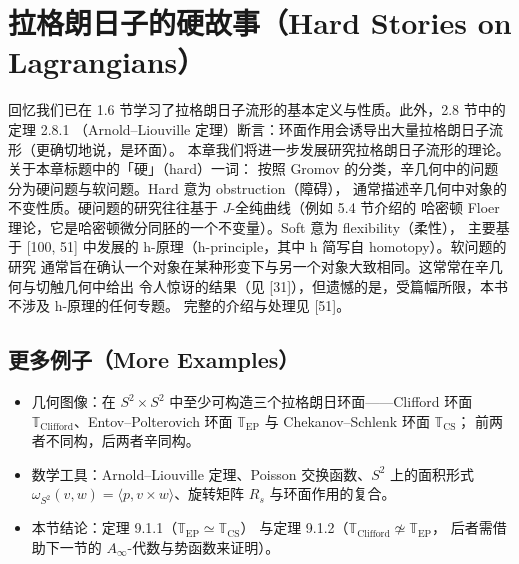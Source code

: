 
\chapter{拉格朗日子的硬故事（Hard Stories on Lagrangians）}

回忆我们已在 1.6 节学习了拉格朗日子流形的基本定义与性质。此外，2.8 节中的定理 2.8.1
（Arnold--Liouville 定理）断言：环面作用会诱导出大量拉格朗日子流形（更确切地说，是环面）。
本章我们将进一步发展研究拉格朗日子流形的理论。关于本章标题中的「硬」（hard）一词：
按照 Gromov 的分类，辛几何中的问题分为硬问题与软问题。Hard 意为 obstruction（障碍），
通常描述辛几何中对象的不变性质。硬问题的研究往往基于 $J$-全纯曲线（例如 5.4 节介绍的
哈密顿 Floer 理论，它是哈密顿微分同胚的一个不变量）。Soft 意为 flexibility（柔性），
主要基于 [100, 51] 中发展的 h-原理（h-principle，其中 h 简写自 homotopy）。软问题的研究
通常旨在确认一个对象在某种形变下与另一个对象大致相同。这常常在辛几何与切触几何中给出
令人惊讶的结果（见 [31]），但遗憾的是，受篇幅所限，本书不涉及 h-原理的任何专题。
完整的介绍与处理见 [51]。

\section{更多例子（More Examples）}

\begin{keytakeaways}
\begin{itemize}
  \item 几何图像：在 $S^2\times S^2$ 中至少可构造三个拉格朗日环面——Clifford 环面
        $\mathbb{T}_{\mathrm{Clifford}}$、Entov--Polterovich 环面
        $\mathbb{T}_{\mathrm{EP}}$ 与 Chekanov--Schlenk 环面 $\mathbb{T}_{\mathrm{CS}}$；
        前两者不同构，后两者辛同构。
  \item 数学工具：Arnold--Liouville 定理、Poisson 交换函数、$S^2$ 上的面积形式
        $\omega_{S^2}(v,w)=\langle p,v\times w\rangle$、旋转矩阵 $R_s$ 与环面作用的复合。
  \item 本节结论：定理 9.1.1（$\mathbb{T}_{\mathrm{EP}}\simeq\mathbb{T}_{\mathrm{CS}}$）
        与定理 9.1.2（$\mathbb{T}_{\mathrm{Clifford}}\not\simeq\mathbb{T}_{\mathrm{EP}}$，
        后者需借助下一节的 $A_\infty$-代数与势函数来证明）。
\end{itemize}
\end{keytakeaways}

